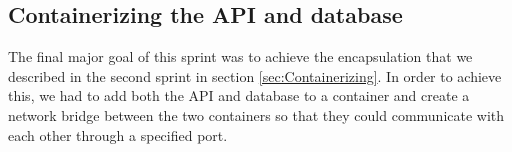 \subsection{Containerizing the API and database}
The final major goal of this sprint was to achieve the encapsulation that we described in the second sprint in section \ref{sec:Containerizing}. 
In order to achieve this, we had to add both the API and database to a container and create a network bridge between the two containers so that they could communicate with each other through a specified port.